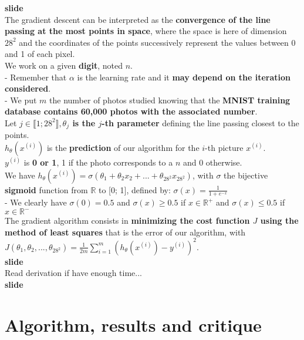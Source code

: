 \documentclass{article}
\begin{document}
	\textbf{slide}\\
	
	The gradient descent can be interpreted as the \textbf{convergence of the line passing at the most points in space}, where the space is here of dimension $28^2$ and the coordinates of the points successively represent the values between 0 and 1 of each pixel.\\
	We work on a given \textbf{digit}, noted $n$.\\
	- Remember that $\alpha$ is the learning rate and it \textbf{may depend on the iteration considered}.\\
	- We put $m$ the number of photos studied knowing that the \textbf{MNIST training database contains 60,000 photos with the associated number}.\\
	Let $j \in \llbracket 1; 28^2 \rrbracket, $\textbf{$\theta_j$ is the $j$-th parameter} defining the line passing closest to the points.\\
	$h_\theta(x^{(i)})$ is the \textbf{prediction} of our algorithm for the $i$-th picture $x^{(i)}$.\\
	$y^{(i)}$ is \textbf{0 or 1}, 1 if the photo corresponds to a $n$ and 0 otherwise.\\
	We have $h_\theta(x^{(i)}) = \sigma(\theta_1 + \theta_2 x_2 + ... + \theta_{28^2} x_{28^2})$, with $\sigma$ the bijective \textbf{sigmoid} function from $\mathbb{R}$ to [0; 1], defined by: $\sigma(x) = \frac{1}{1 + e^{-x}}$\\
	- We clearly have $\sigma(0) = 0.5$ and $\sigma(x) \geq 0.5$ if $x \in \mathbb{R}^+$ and $\sigma(x) \leq 0.5$ if $x \in \mathbb{R}^-$\\
	The gradient algorithm consists in \textbf{minimizing the cost function $J$ using the method of least squares} that is the error of our algorithm, with $J(\theta_1, \theta_2, ..., \theta_{28^2}) = \frac{1}{2m}\sum_{i=1}^{m}(h_\theta(x^{(i)}) - y^{(i)})^2$.\\
	
	\textbf{slide}\\
	
	Read derivation if have enough time...\\
	
	\textbf{slide}\\
	
	\section{Algorithm, results and critique}
	
\end{document}

